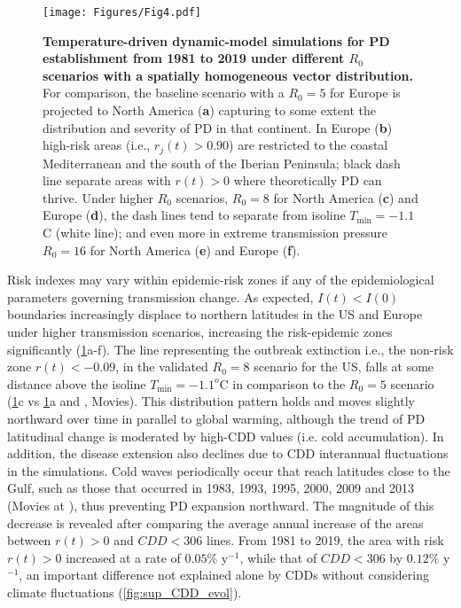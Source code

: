     \begin{figure}[H]
        \centering
        \texttt{[image: Figures/Fig4.pdf]}
        \caption{\textbf{Temperature-driven dynamic-model simulations for PD
                establishment from 1981 to 2019 under different $R_0$ scenarios
                with a
                spatially homogeneous vector distribution.} For comparison, the
            baseline
            scenario with a $R_0=5$ for Europe is projected to North America
            (\textbf{a})
            capturing to some extent the distribution and severity of PD in
            that continent.
            In Europe (\textbf{b}) high-risk areas (i.e., $r_j(t) > 0.90$) are
            restricted
            to the coastal Mediterranean and the south of the Iberian
            Peninsula; black dash
            line separate areas with $r(t)>0$ where theoretically PD can
            thrive. Under
            higher $R_0$ scenarios, $R_0=8$ for North America (\textbf{c}) and
            Europe
            (\textbf{d}), the dash lines tend to separate from isoline
            $T_{\textrm{min}} =
                -1.1$\textdegree C (white line); and even more in extreme
            transmission pressure
            $R_0=16$ for North America (\textbf{e}) and Europe (\textbf{f}). }
        \label{fig4}
    \end{figure}

    Risk indexes may vary within epidemic-risk zones if any of the
    epidemiological
    parameters governing transmission change. As expected, $I(t) < I(0)$
    boundaries
    increasingly displace to northern latitudes in the US and Europe under
    higher
    transmission scenarios, increasing the risk-epidemic zones significantly
    (\cref{fig4}a-f). The line representing the outbreak extinction i.e., the
    non-risk zone $r(t)<-0.09$, in the validated $R_0=8$ scenario for the US,
    falls
    at some distance above the isoline $T_{\textrm{min}} = -1.1^o$C in
    comparison
    to the $R_0=5$ scenario (\cref{fig4}c vs \cref{fig4}a and \cite{Webpage},
    Movies). This distribution pattern holds and moves slightly northward over
    time
    in parallel to global warming, although the trend of PD latitudinal change
    is
    moderated by high-CDD values (i.e. cold accumulation). In addition, the
    disease
    extension also declines due to CDD interannual fluctuations in the
    simulations.
    Cold waves periodically occur that reach latitudes close to the Gulf, such
    as
    those that occurred in 1983, 1993, 1995, 2000, 2009 and 2013 (Movies at
    \cite{Webpage}), thus preventing PD expansion northward. The magnitude of
    this
    decrease is revealed after comparing the average annual increase of the
    areas
    between $r(t) > 0$ and $CDD < 306$ lines. From 1981 to 2019, the area with
    risk
$r(t) > 0$ increased at a rate of $0.05\%$ y$^{-1}$, while that of $CDD < 306$
    by $0.12\%$ y$^{-1}$, an important difference not explained alone by CDDs
    without considering climate fluctuations (\cref{fig:sup_CDD_evol}).

